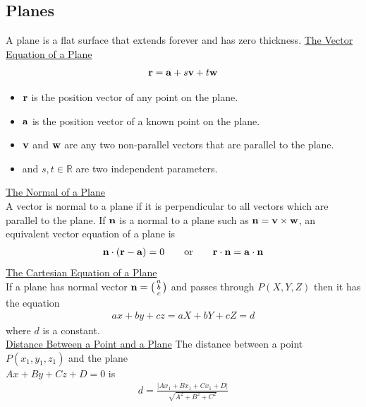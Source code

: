 \documentclass[10pt, a4paper, titlepage]{article}
\newcommand{\mbb}[1]{\mathbb{#1}}
\begin{document}
\begin{multicols*}{3}
	\dotfill
	\subsection{Planes}
	A plane is a flat surface that extends forever and has zero thickness.
	\underline{The Vector Equation of a Plane}
	\begin{align}
		\vb{r}=\vb{a}+s\vb{v}+t\vb{w}
	\end{align}
	\begin{itemize}
		\item $\vb{r}$ is the position vector of any point on the plane.
		\item $\vb{a}$ is the position vector of a known point on the plane.
		\item $\vb{v}$ and $\vb{w}$ are any two non-parallel vectors that are parallel to the plane.
		\item and $s,t\in\mbb{R}$ are two independent parameters.
	\end{itemize}
	\underline{The Normal of a Plane}\\
	A vector is normal to a plane if it is perpendicular to all vectors which are parallel to the plane. If $\vb{n}$ is a normal to a plane such as $\vb{n}=\vb{v}\times\vb{w}$, an equivalent vector equation of a plane is
	\begin{align}
		\vb{n}\cdot(\vb{r}-\vb{a})=0\qquad\text{or}\qquad\vb{r}\cdot\vb{n}=\vb{a}\cdot\vb{n}
	\end{align}
	\underline{The Cartesian Equation of a Plane}\\
	If a plane has normal vector $\vb{n}=\big(\begin{smallmatrix}a \\b \\c \end{smallmatrix}\big)$
	and passes through $P(X, Y, Z)$ then it has the equation
	\begin{align}
		ax+by+cz=aX+bY+cZ=d
	\end{align}
	where $d$ is a constant.\\

	\underline{Distance Between a Point and a Plane}
	The distance between a point $P(x_1,y_1,z_1)$ and  the plane \\$Ax+By+Cz+D=0$ is
	\begin{align}
		d=\frac{|Ax_1+Bx_1+Cx_1+D|}{\sqrt{A^2+B^2+C^2}}
	\end{align}


\end{multicols*}
\end{document}
